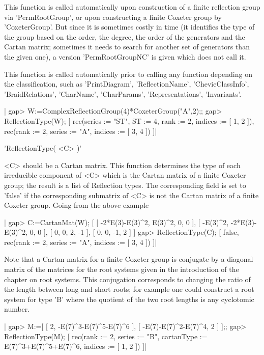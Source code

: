 This  function  is  called  automatically  upon  construction  of  a finite
reflection group via 'PermRootGroup', or upon constructing a finite Coxeter
group  by  'CoxeterGroup'.  But  since  it  is sometimes costly in time (it
identifies  the type of the group based on the order, the degree, the order
of  the generators and the Cartan matrix;  sometimes it needs to search for
another  set of generators than the given one), a version 'PermRootGroupNC'
is given which does not call it.

This  function  is  called  automatically  prior  to  calling  any function
depending  on the classification, such as 'PrintDiagram', 'ReflectionName',
'ChevieClassInfo',      'BraidRelations',     'CharName',     'CharParams',
'Representations', 'Invariants'.

|    gap> W:=ComplexReflectionGroup(4)*CoxeterGroup("A",2);;
    gap> ReflectionType(W);
    [ rec(series  := "ST",
          ST      := 4,
          rank    := 2,
          indices := [ 1, 2 ]), rec(rank    := 2,
          series  := "A",
          indices := [ 3, 4 ]) ]|

'ReflectionType( <C> )'

<C>  should be a Cartan  matrix. This function determines  the type of each
irreducible component of <C> which is the Cartan matrix of a finite Coxeter
group; the result is a list of Reflection types. The corresponding field is
set  to 'false'  if the  corresponding submatrix  of <C>  is not the Cartan
matrix of a finite Coxeter group. Going from the above example\:

|    gap> C:=CartanMat(W);
    [ [ -2*E(3)-E(3)^2, E(3)^2, 0, 0 ], [ -E(3)^2, -2*E(3)-E(3)^2, 0, 0 ],
      [ 0, 0, 2, -1 ], [ 0, 0, -1, 2 ] ]
    gap> ReflectionType(C);
    [ false, rec(rank    := 2,
          series  := "A",
          indices := [ 3, 4 ]) ]|

Note  that a  Cartan matrix  for a  finite Coxeter  group is conjugate by a
diagonal  matrix  of  the  matrices  for  the  root  systems  given  in the
introduction  of the chapter on  root systems. This conjugation corresponds
to  changing the  ratio of  the length  between long  and short  roots; for
example  one could construct a root system  for type 'B' where the quotient
of the two root lengths is any cyclotomic number.

|    gap> M:=[ [ 2, -E(7)^3-E(7)^5-E(7)^6 ], [ -E(7)-E(7)^2-E(7)^4, 2 ] ];;
    gap> ReflectionType(M);
    [ rec(rank       := 2,
          series     := "B",
          cartanType := E(7)^3+E(7)^5+E(7)^6,
          indices    := [ 1, 2 ]) ]|

